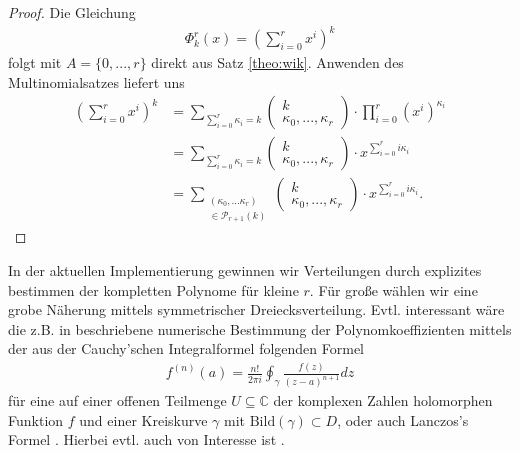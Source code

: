 \documentclass{article}
\newtheorem{proof}{Beweis}
\begin{document}
\begin{proof}
    Die Gleichung
    \begin{align*}
        \Phi_k^r(x) = \left(\sum_{i=0}^r x^i \right)^k
    \end{align*}
    folgt mit $A=\{0,...,r\}$ direkt aus Satz \ref{theo:wik}.
    Anwenden des Multinomialsatzes liefert uns
    \begin{align*}
        \left(\sum_{i=0}^r x^i\right)^k & = \sum_{\sum_{i=0}^r \kappa_i = k} \begin{pmatrix} k \\ \kappa_0, ..., \kappa_r \end{pmatrix} \cdot \prod_{i=0}^r (x^i)^{\kappa_i} \\
                                        & = \sum_{\sum_{i=0}^r \kappa_i = k} \begin{pmatrix} k \\ \kappa_0, ..., \kappa_r \end{pmatrix} \cdot x^{\sum_{i=0}^r i \kappa_i}    \\
                                        & = \sum_{\substack{(\kappa_0, ... \kappa_r)                                                         \\ \in \mathcal{P}_{r+1}(k)}} \begin{pmatrix} k \\ \kappa_0, ..., \kappa_r \end{pmatrix} \cdot x^{\sum_{i=0}^r i \kappa_i}.
    \end{align*}
\end{proof}

In der aktuellen Implementierung gewinnen wir Verteilungen durch explizites bestimmen der kompletten Polynome für kleine $r$. Für große wählen wir eine grobe Näherung mittels symmetrischer Dreiecksverteilung.
Evtl. interessant wäre die z.B. in \cite{hosono} beschriebene numerische Bestimmung der Polynomkoeffizienten mittels der aus der Cauchy'schen Integralformel folgenden Formel
\begin{align*}
    f^{(n)}(a) = \frac{n!}{2 \pi i} \oint_\gamma \frac{f(z)}{(z-a)^{n+1}} dz
\end{align*}
für eine auf einer offenen Teilmenge $U \subseteq \mathbb{C}$ der komplexen Zahlen holomorphen Funktion $f$ und einer Kreiskurve $\gamma$ mit $\text{Bild}(\gamma) \subset D$, oder auch Lanczos's Formel \cite{lanczos}. Hierbei evtl. auch von Interesse ist \cite{lyness-delves}.

\printbibliography
\end{document}
